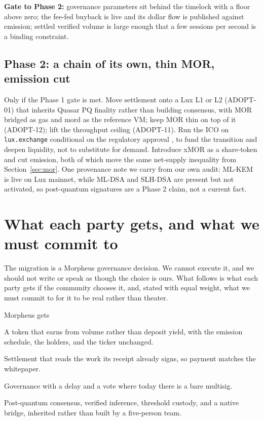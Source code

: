 \documentclass[11pt,a4paper]{article}
\newcommand{\code}[1]{\texttt{\small #1}}
\newcommand{\prov}[1]{{\color{muted}\footnotesize\sffamily[#1]}}
\begin{document}
\textbf{Gate to Phase 2:} governance parameters sit behind the timelock with a floor above zero;
the fee-fed buyback is live and its dollar flow is published against emission; settled verified
volume is large enough that a few sessions per second is a binding constraint.

\subsection{Phase 2: a chain of its own, thin MOR, emission cut}

Only if the Phase 1 gate is met. Move settlement onto a Lux L1 or L2 (ADOPT-01) that inherits
Quasar PQ finality rather than building consensus, with MOR bridged as gas and mord as the
reference VM; keep MOR thin on top of it (ADOPT-12); lift the throughput ceiling (ADOPT-11).
Run the ICO on \code{lux.exchange} conditional on the regulatory approval \prov{pending}, to
fund the transition and deepen liquidity, not to substitute for demand. Introduce xMOR as a
share-token and cut emission, both of which move the same net-supply inequality from
Section~\ref{sec:mor}. One provenance note we carry from our own audit: ML-KEM is live on Lux
mainnet, while ML-DSA and SLH-DSA are present but not activated, so post-quantum signatures are a
Phase 2 claim, not a current fact.

\section{What each party gets, and what we must commit to}
\label{sec:parties}

The migration is a Morpheus governance decision. We cannot execute it, and we should not write
or speak as though the choice is ours. What follows is what each party gets if the community
chooses it, and, stated with equal weight, what we must commit to for it to be real rather than
theater.

\begin{stake}{Morpheus gets}
  \item A token that earns from volume rather than deposit yield, with the emission schedule,
    the holders, and the ticker unchanged.
  \item Settlement that reads the work its receipt already signs, so payment matches the
    whitepaper.
  \item Governance with a delay and a vote where today there is a bare multisig.
  \item Post-quantum consensus, verified inference, threshold custody, and a native bridge,
    inherited rather than built by a five-person team.
\end{stake}
\end{document}
